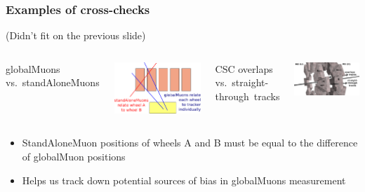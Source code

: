 \documentclass[compress]{beamer}
\begin{document}
\begin{frame}
\frametitle{Examples of cross-checks}

(Didn't fit on the previous slide)

\vfill
\begin{columns}
\scriptsize globalMuons vs.\ \mbox{standAloneMuons\hspace{-1 cm}}

\vspace{0.1 cm}
\includegraphics[height=3 cm]{globalMuon_standAloneMuon.png}

\scriptsize CSC overlaps vs.\ \mbox{straight-through tracks\hspace{-1 cm}}

\vspace{0.1 cm}
\includegraphics[height=3 cm]{overlaps_straight_through.png}
\end{columns}

\vfill
\begin{itemize}\setlength{\itemsep}{0.1 cm}
\item StandAloneMuon positions of wheels A and B must be equal to the difference of globalMuon positions
\item Helps us track down potential sources of bias in globalMuons measurement
\end{itemize}
\label{numpages}
\end{frame}
\end{document}

